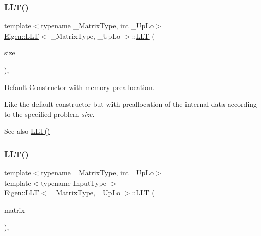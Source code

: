 \subsubsection{\texorpdfstring{LLT()}{LLT()}\hspace{0.1cm}{\footnotesize\ttfamily [2/3]}}
{\footnotesize\ttfamily template$<$typename \+\_\+\+Matrix\+Type, int \+\_\+\+Up\+Lo$>$ \\
\mbox{\hyperlink{class_eigen_1_1_l_l_t}{Eigen\+::\+L\+LT}}$<$ \+\_\+\+Matrix\+Type, \+\_\+\+Up\+Lo $>$\+::\mbox{\hyperlink{class_eigen_1_1_l_l_t}{L\+LT}} (\begin{DoxyParamCaption}\item[{\mbox{\hyperlink{class_eigen_1_1_l_l_t_ac7a64274814fa76e8b1e9e945546037f}{Index}}}]{size }\end{DoxyParamCaption})\hspace{0.3cm}{\ttfamily [inline]}, {\ttfamily [explicit]}}



Default Constructor with memory preallocation. 

Like the default constructor but with preallocation of the internal data according to the specified problem {\itshape size}. \begin{DoxySeeAlso}{See also}
\mbox{\hyperlink{class_eigen_1_1_l_l_t_a16d1ec9ea6497ba1febb242c2e8a7a96}{L\+L\+T()}} 
\end{DoxySeeAlso}
\mbox{\label{class_eigen_1_1_l_l_t_a1848a00addade9a0f7f70493c52ecc9d}} 
\subsubsection{\texorpdfstring{LLT()}{LLT()}\hspace{0.1cm}{\footnotesize\ttfamily [3/3]}}
{\footnotesize\ttfamily template$<$typename \+\_\+\+Matrix\+Type, int \+\_\+\+Up\+Lo$>$ \\
template$<$typename Input\+Type $>$ \\
\mbox{\hyperlink{class_eigen_1_1_l_l_t}{Eigen\+::\+L\+LT}}$<$ \+\_\+\+Matrix\+Type, \+\_\+\+Up\+Lo $>$\+::\mbox{\hyperlink{class_eigen_1_1_l_l_t}{L\+LT}} (\begin{DoxyParamCaption}\item[{\mbox{\hyperlink{struct_eigen_1_1_eigen_base}{Eigen\+Base}}$<$ Input\+Type $>$ \&}]{matrix }\end{DoxyParamCaption})\hspace{0.3cm}{\ttfamily [inline]}, {\ttfamily [explicit]}}



